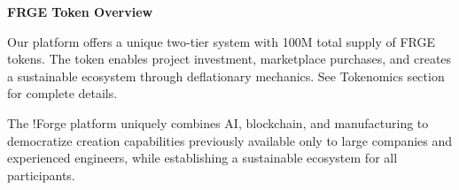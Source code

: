 \vspace{0.2cm}
\begin{center}
\begin{minipage}{0.95\textwidth}
\textcolor{fabAccent}{\textbf{FRGE Token Overview}}
\end{minipage}
\end{center}

\vspace{0.05cm}
\noindent Our platform offers a unique two-tier system with 100M total supply of FRGE tokens. The token enables project investment, marketplace purchases, and creates a sustainable ecosystem through deflationary mechanics. See Tokenomics section for complete details.

\vspace{0.2cm}
\noindent The !Forge platform uniquely combines AI, blockchain, and manufacturing to democratize creation capabilities previously available only to large companies and experienced engineers, while establishing a sustainable ecosystem for all participants. 